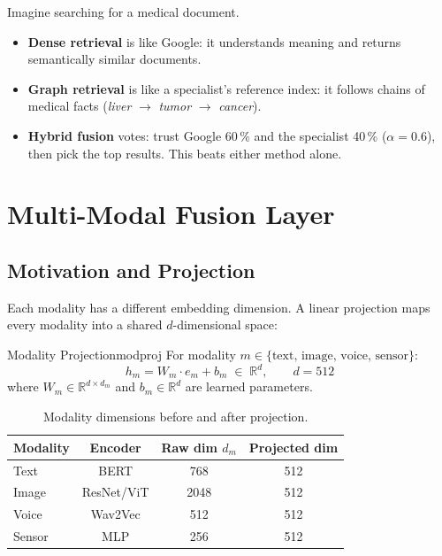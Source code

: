 \documentclass[12pt,a4paper]{article}
\newenvironment{plainbox}[1]{%
  \begin{tcolorbox}[myplain,title={#1}]
}{%
  \end{tcolorbox}
}
\newcommand{\R}{\mathbb{R}}
\begin{document}
\begin{plainbox}{In Plain English}
Imagine searching for a medical document.
\begin{itemize}
  \item \textbf{Dense retrieval} is like Google: it understands meaning and returns
        semantically similar documents.
  \item \textbf{Graph retrieval} is like a specialist's reference index: it follows
        chains of medical facts (\emph{liver} $\to$ \emph{tumor} $\to$
        \emph{cancer}).
  \item \textbf{Hybrid fusion} votes: trust Google 60\,\% and the specialist 40\,\%
        ($\alpha=0.6$), then pick the top results. This beats either method alone.
\end{itemize}
\end{plainbox}

\section{Multi-Modal Fusion Layer}

\subsection{Motivation and Projection}

Each modality has a different embedding dimension. A linear projection maps
every modality into a shared $d$-dimensional space:

\begin{definition}{Modality Projection}{modproj}
For modality $m \in \{\text{text, image, voice, sensor}\}$:
\[
  h_m = W_m \cdot e_m + b_m \;\in\; \R^{d}, \qquad d = 512
\]
where $W_m \in \R^{d \times d_m}$ and $b_m \in \R^d$ are learned parameters.
\end{definition}

\begin{table}[H]
\centering
\caption{Modality dimensions before and after projection.}
\begin{tabular}{lccc}
\toprule
\textbf{Modality} & \textbf{Encoder} & \textbf{Raw dim $d_m$} & \textbf{Projected dim} \\
\midrule
Text   & BERT        & 768  & 512 \\
Image  & ResNet/ViT  & 2048 & 512 \\
Voice  & Wav2Vec     & 512  & 512 \\
Sensor & MLP         & 256  & 512 \\
\bottomrule
\end{tabular}
\end{table}
\end{document}
